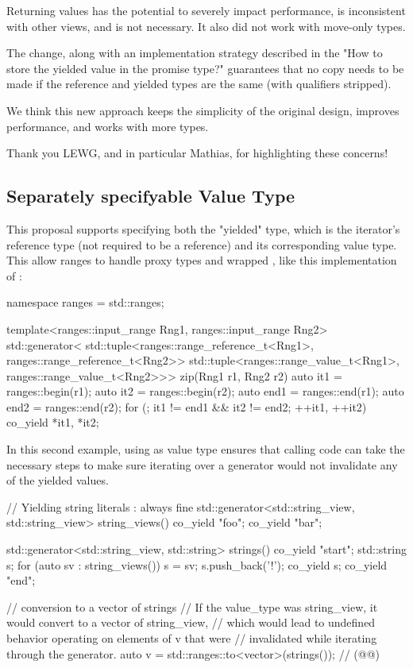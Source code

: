 \documentclass{wg21}
\begin{document}
Returning values has the potential to severely impact performance, is inconsistent with other views, and is not necessary.
It also did not work with move-only types.

The change, along with an implementation strategy described in the "How to store the yielded value in the promise type?" guarantees that
no copy needs to be made if the reference and yielded types are the same (with qualifiers stripped).

We think this new approach keeps the simplicity of the original design, improves performance, and works with more types.

Thank you LEWG, and in particular Mathias, for highlighting these concerns!

\subsection{Separately specifyable Value Type}

This proposal supports specifying both the "yielded" type, which is the iterator's reference type (not required to be a reference) and its corresponding value type.
This allow ranges to handle proxy types and wrapped , like this implementation of :

\begin{colorblock}
namespace ranges = std::ranges;

template<ranges::input_range Rng1, ranges::input_range Rng2>
std::generator<
    std::tuple<ranges::range_reference_t<Rng1>, ranges::range_reference_t<Rng2>>
    std::tuple<ranges::range_value_t<Rng1>, ranges::range_value_t<Rng2>>>
zip(Rng1 r1, Rng2 r2) {
    auto it1 = ranges::begin(r1);
    auto it2 = ranges::begin(r2);
    auto end1 = ranges::end(r1);
    auto end2 = ranges::end(r2);
    for (; it1 != end1 && it2 != end2; ++it1, ++it2) {
        co_yield {*it1, *it2};
    }
}
\end{colorblock}

In this second example, using  as value type ensures that calling code can take the necessary steps
to make sure iterating over a generator would not invalidate any of the yielded values.

\begin{colorblock}
// Yielding string literals : always fine
std::generator<std::string_view, std::string_view> string_views() {
    co_yield "foo";
    co_yield "bar";
}

std::generator<std::string_view, std::string> strings() {
    co_yield "start";
    std::string s;
    for (auto sv : string_views()) {
        s = sv;
        s.push_back('!');
        co_yield s;
    }
    co_yield "end";
}

// conversion to a vector of strings
// If the value_type was string_view, it would convert to a vector of string_view,
// which would lead to undefined behavior operating on elements of v that were
// invalidated while iterating through the generator.
auto v = std::ranges::to<vector>(strings()); // (@{}@)
\end{colorblock}
\end{document}
